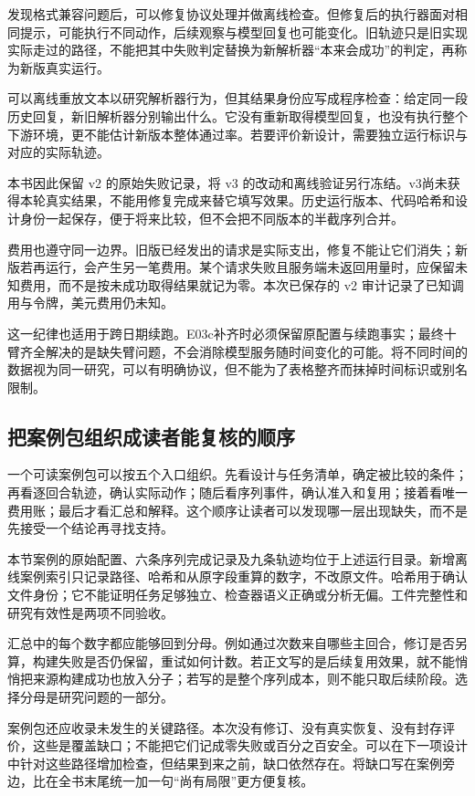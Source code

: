 发现格式兼容问题后，可以修复协议处理并做离线检查。但修复后的执行器面对相同提示，可能执行不同动作，后续观察与模型回复也可能变化。旧轨迹只是旧实现实际走过的路径，不能把其中失败判定替换为新解析器“本来会成功”的判定，再称为新版真实运行。

可以离线重放文本以研究解析器行为，但其结果身份应写成程序检查：给定同一段历史回复，新旧解析器分别输出什么。它没有重新取得模型回复，也没有执行整个下游环境，更不能估计新版本整体通过率。若要评价新设计，需要独立运行标识与对应的实际轨迹。

本书因此保留 v2 的原始失败记录，将 v3 的改动和离线验证另行冻结。v3尚未获得本轮真实结果，不能用修复完成来替它填写效果。历史运行版本、代码哈希和设计身份一起保存，便于将来比较，但不会把不同版本的半截序列合并。

费用也遵守同一边界。旧版已经发出的请求是实际支出，修复不能让它们消失；新版若再运行，会产生另一笔费用。某个请求失败且服务端未返回用量时，应保留未知费用，而不是按未成功取得结果就记为零。本次已保存的 v2 审计记录了已知调用与令牌，美元费用仍未知。

这一纪律也适用于跨日期续跑。E03c补齐时必须保留原配置与续跑事实；最终十臂齐全解决的是缺失臂问题，不会消除模型服务随时间变化的可能。将不同时间的数据视为同一研究，可以有明确协议，但不能为了表格整齐而抹掉时间标识或别名限制。

\subsection{把案例包组织成读者能复核的顺序}
\label{sec:ch15-casebundle}

一个可读案例包可以按五个入口组织。先看设计与任务清单，确定被比较的条件；再看逐回合轨迹，确认实际动作；随后看序列事件，确认准入和复用；接着看唯一费用账；最后才看汇总和解释。这个顺序让读者可以发现哪一层出现缺失，而不是先接受一个结论再寻找支持。

本节案例的原始配置、六条序列完成记录及九条轨迹均位于上述运行目录。新增离线案例索引只记录路径、哈希和从原字段重算的数字，不改原文件。哈希用于确认文件身份；它不能证明任务足够独立、检查器语义正确或分析无偏。工件完整性和研究有效性是两项不同验收。

汇总中的每个数字都应能够回到分母。例如通过次数来自哪些主回合，修订是否另算，构建失败是否仍保留，重试如何计数。若正文写的是后续复用效果，就不能悄悄把来源构建成功也放入分子；若写的是整个序列成本，则不能只取后续阶段。选择分母是研究问题的一部分。

案例包还应收录未发生的关键路径。本次没有修订、没有真实恢复、没有封存评价，这些是覆盖缺口；不能把它们记成零失败或百分之百安全。可以在下一项设计中针对这些路径增加检查，但结果到来之前，缺口依然存在。将缺口写在案例旁边，比在全书末尾统一加一句“尚有局限”更方便复核。


